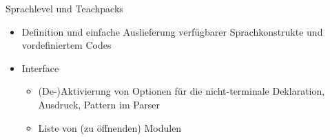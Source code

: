 \documentclass
[handout]
{beamer}
\begin{document}
\begin{frame}{Sprachlevel und Teachpacks}
  \begin{itemize}
    \item Definition und einfache Auslieferung verfügbarer Sprachkonstrukte
      und vordefiniertem Codes
    \item Interface
      \begin{itemize}
        \item (De-)Aktivierung von Optionen für die nicht-terminale Deklaration, Ausdruck, Pattern im Parser
        \item Liste von (zu öffnenden) Modulen
      \end{itemize}
  \end{itemize}
\end{frame}
\end{document}
